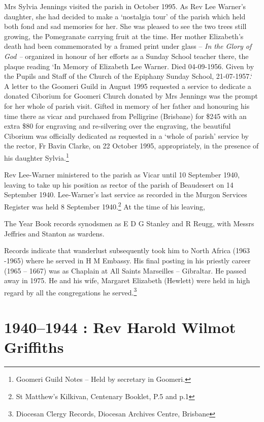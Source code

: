 Mrs Sylvia Jennings visited the parish in October 1995. As Rev Lee
Warner's daughter, she had decided to make a `nostalgia tour' of the
parish which held both fond and sad memories for her. She was pleased to
see the two trees still growing, the Pomegranate carrying fruit at the
time. Her mother Elizabeth's death had been commemorated by a framed
print under glass -- \emph{In the Glory of God --} organized in honour
of her efforts as a Sunday School teacher there, the plaque reading `In
Memory of Elizabeth Lee Warner. Died 04-09-1956. Given by the Pupils and
Staff of the Church of the Epiphany Sunday School, 21-07-1957.` A letter
to the Goomeri Guild in August 1995 requested a service to dedicate a
donated Ciborium for Goomeri Church donated by Mrs Jennings was the
prompt for her whole of parish visit. Gifted in memory of her father and
honouring his time there as vicar and purchased from Pelligrine
(Brisbane) for \$245 with an extra \$80 for engraving and re-silvering
over the engraving, the beautiful Ciborium was officially dedicated as
requested in a `whole of parish' service by the rector, Fr Bavin Clarke,
on 22 October 1995, appropriately, in the presence of his daughter
Sylvia.\footnote{Goomeri Guild Notes -- Held by secretary in Goomeri.}

Rev Lee-Warner ministered to the parish as Vicar until 10 September
1940, leaving to take up his position as rector of the parish of
Beaudesert on 14 September 1940. Lee-Warner's last service as recorded
in the Murgon Services Register was held 8 September 1940.\footnote{St
  Matthew's Kilkivan, Centenary Booklet, P.5 and p.1} At the time of his
leaving,

The Year Book records synodsmen as E D G Stanley and R Reugg, with
Messrs Jeffries and Stanton as wardens.

Records indicate that wanderlust subsequently took him to North Africa
(1963 -1965) where he served in H M Embassy. His final posting in his
priestly career (1965 -- 1667) was as Chaplain at All Saints Marseilles
-- Gibraltar. He passed away in 1975. He and his wife, Margaret
Elizabeth (Hewlett) were held in high regard by all the congregations he
served.\footnote{Diocesan Clergy Records, Diocesan Archives Centre,
  Brisbane}

\printendnotes
\setcounter{endnote}{0}
\chapter{1940--1944 : Rev Harold Wilmot
Griffiths}

